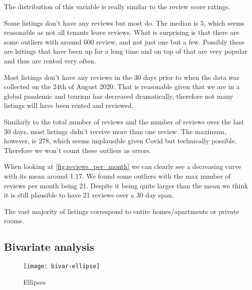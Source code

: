 The distribution of this variable is really similar to the review score ratings.




Some listings don't have any reviews but most do. The median is 5,
which seems reasonable as not all tenants leave reviews. What is
surprising is that there are some outliers with around 600 review,
and not just one but a few. Possibly these are lsitings that have been
up for a long time and on top of that are very popular and thus
are rented very often.


Most listings don't have any reviews in the 30 days prior to
when the data was collected on the 24th of August 2020.
That is reasonable given that we are
in a global pandemic and tourism has decreased dramatically, therefore
not many \airbnb listings will have been rented and reviewed.



Similarly to the total number of reviews and the number of reviews
over the last 30 days, most listings didn't receive more than one
review. The maximum, however, is 278, which seems implausible given
Covid but technically possible. Therefore we won't count these
outliers as errors.


When looking at \cref{fig:reviews_per_month} we can clearly see a decreasing
curve with its mean around 1.17. We found some outliers with the max number of
reviews per month being 21. Despite it being quite larger than the mean we think
it is still plausible to have 21 reviews over a 30 day span.


The vast majority of listings correspond to entire homes/apartments or private
rooms.

\pagebreak
\subsection{Bivariate analysis}%
\label{sub:bivariate_analysis}

\begin{figure}[H]
    \centering
    \texttt{[image: bivar-ellipse]}
    \caption{Ellipses}%
    \label{fig:ellipses}
\end{figure}

